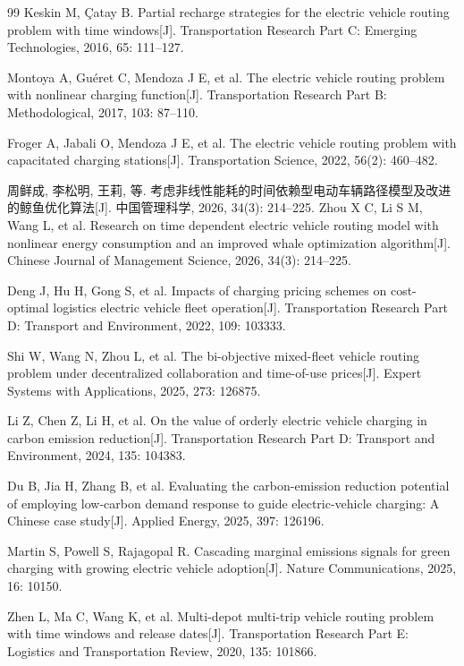 \begin{thebibliography}{99}
 Keskin M, \c{C}atay B. Partial recharge strategies for the electric vehicle routing problem with time windows[J]. Transportation Research Part C: Emerging Technologies, 2016, 65: 111--127.

 Montoya A, Guéret C, Mendoza J E, et al. The electric vehicle routing problem with nonlinear charging function[J]. Transportation Research Part B: Methodological, 2017, 103: 87--110.

 Froger A, Jabali O, Mendoza J E, et al. The electric vehicle routing problem with capacitated charging stations[J]. Transportation Science, 2022, 56(2): 460--482.

 周鲜成, 李松明, 王莉, 等. 考虑非线性能耗的时间依赖型电动车辆路径模型及改进的鲸鱼优化算法[J]. 中国管理科学, 2026, 34(3): 214--225.\newline
Zhou X C, Li S M, Wang L, et al. Research on time dependent electric vehicle routing model with nonlinear energy consumption and an improved whale optimization algorithm[J]. Chinese Journal of Management Science, 2026, 34(3): 214--225.

 Deng J, Hu H, Gong S, et al. Impacts of charging pricing schemes on cost-optimal logistics electric vehicle fleet operation[J]. Transportation Research Part D: Transport and Environment, 2022, 109: 103333.

 Shi W, Wang N, Zhou L, et al. The bi-objective mixed-fleet vehicle routing problem under decentralized collaboration and time-of-use prices[J]. Expert Systems with Applications, 2025, 273: 126875.

 Li Z, Chen Z, Li H, et al. On the value of orderly electric vehicle charging in carbon emission reduction[J]. Transportation Research Part D: Transport and Environment, 2024, 135: 104383.

 Du B, Jia H, Zhang B, et al. Evaluating the carbon-emission reduction potential of employing low-carbon demand response to guide electric-vehicle charging: A Chinese case study[J]. Applied Energy, 2025, 397: 126196.

 Martin S, Powell S, Rajagopal R. Cascading marginal emissions signals for green charging with growing electric vehicle adoption[J]. Nature Communications, 2025, 16: 10150.

 Zhen L, Ma C, Wang K, et al. Multi-depot multi-trip vehicle routing problem with time windows and release dates[J]. Transportation Research Part E: Logistics and Transportation Review, 2020, 135: 101866.


\end{thebibliography}
